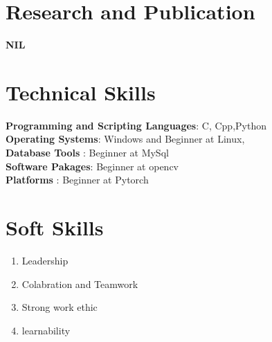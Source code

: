 \documentclass[margin,line]{res}
\begin{document}
\begin{resume}
\section{\sc Research and Publication}

\bf NIL
\vspace{.1in}
\section{\sc Technical Skills}
{\bf Programming and Scripting Languages}:  C, Cpp,Python \\
{\bf Operating Systems}: Windows and Beginner at Linux,\\
{\bf Database Tools}  :  Beginner at MySql\\
{\bf Software Pakages}:  Beginner at opencv\\
{\bf Platforms}       : Beginner at Pytorch
\section{\sc Soft Skills}
\begin{enumerate} %
	\item Leadership 
	\item Colabration and Teamwork
	\item Strong work ethic 
	\item learnability 
\end{enumerate}
\end{resume}
\end{document}
